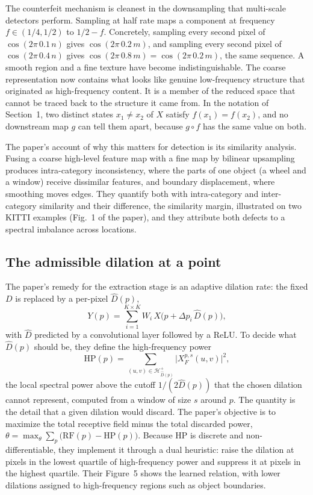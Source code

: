 \documentclass[11pt]{article}
\theoremstyle{definition}
\theoremstyle{remark}
\newcommand{\HP}{\mathrm{HP}}
\begin{document}
The counterfeit mechanism is cleanest in the downsampling that multi-scale detectors perform. Sampling at half rate maps a component at frequency $f\in(1/4,1/2)$ to $1/2-f$. Concretely, sampling every second pixel of $\cos(2\pi\,0.1\,n)$ gives $\cos(2\pi\,0.2\,m)$, and sampling every second pixel of $\cos(2\pi\,0.4\,n)$ gives $\cos(2\pi\,0.8\,m)=\cos(2\pi\,0.2\,m)$, the same sequence. A smooth region and a fine texture have become indistinguishable. The coarse representation now contains what looks like genuine low-frequency structure that originated as high-frequency content. It is a member of the reduced space that cannot be traced back to the structure it came from. In the notation of Section~1, two distinct states $x_1\neq x_2$ of $X$ satisfy $f(x_1)=f(x_2)$, and no downstream map $g$ can tell them apart, because $g\circ f$ has the same value on both.

The paper's account of why this matters for detection is its similarity analysis. Fusing a coarse high-level feature map with a fine map by bilinear upsampling produces intra-category inconsistency, where the parts of one object (a wheel and a window) receive dissimilar features, and boundary displacement, where smoothing moves edges. They quantify both with intra-category and inter-category similarity and their difference, the similarity margin, illustrated on two KITTI examples (Fig.~1 of the paper), and they attribute both defects to a spectral imbalance across locations.

\subsection{The admissible dilation at a point}

The paper's remedy for the extraction stage is an adaptive dilation rate: the fixed $D$ is replaced by a per-pixel $\hat D(p)$,
\begin{equation}
  Y(p)=\sum_{i=1}^{K\times K}W_i\,X\big(p+\Delta p_i\,\hat D(p)\big),
  \label{eq:adaptive}
\end{equation}
with $\hat D$ predicted by a convolutional layer followed by a ReLU. To decide what $\hat D(p)$ should be, they define the high-frequency power
\begin{equation}
  \HP(p)=\sum_{(u,v)\in\mathcal H^{+}_{\hat D(p)}}\big|X_F^{p,s}(u,v)\big|^2,
  \label{eq:hp}
\end{equation}
the local spectral power above the cutoff $1/(2\hat D(p))$ that the chosen dilation cannot represent, computed from a window of size $s$ around $p$. The quantity is the detail that a given dilation would discard. The paper's objective is to maximize the total receptive field minus the total discarded power, $\theta=\max_\theta\sum_p\big(\mathrm{RF}(p)-\HP(p)\big)$. Because $\HP$ is discrete and non-differentiable, they implement it through a dual heuristic: raise the dilation at pixels in the lowest quartile of high-frequency power and suppress it at pixels in the highest quartile. Their Figure~5 shows the learned relation, with lower dilations assigned to high-frequency regions such as object boundaries.
\end{document}
